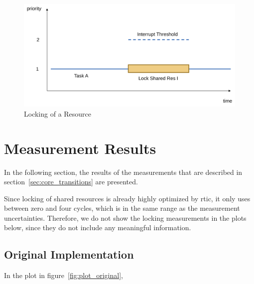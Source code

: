 \begin{figure}
  \centerfloat
  \includegraphics[width=\textwidth]{fig/locking_low_prio.svg.pdf}
  \caption{Locking of a Resource}%
  \label{fig:locking_low_prio}
\end{figure}

\section{Measurement Results}

In the following section, the results of the measurements that are described in section~\ref{sec:core_transitions} are presented.

Since locking of shared resources is already highly optimized by \gls{rtic}, it only uses between zero and four cycles, which is in the same range as the measurement uncertainties. Therefore, we do not show the locking measurements in the plots below, since they do not include any meaningful information.

\subsection{Original Implementation}

In the plot in figure~\ref{fig:plot_original}, 


